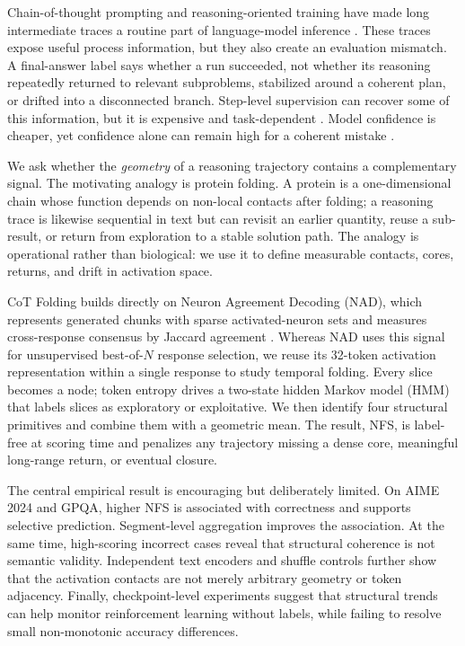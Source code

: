 \documentclass{article}
\newcommand{\nfs}{\textsc{NFS}}
\begin{document}
Chain-of-thought prompting and reasoning-oriented training have made long intermediate traces a routine part of language-model inference \citep{wei2022chain,wang2023selfconsistency,deepseek2025r1}. These traces expose useful process information, but they also create an evaluation mismatch. A final-answer label says whether a run succeeded, not whether its reasoning repeatedly returned to relevant subproblems, stabilized around a coherent plan, or drifted into a disconnected branch. Step-level supervision can recover some of this information, but it is expensive and task-dependent \citep{lightman2023verify}. Model confidence is cheaper, yet confidence alone can remain high for a coherent mistake \citep{kadavath2022know}.

We ask whether the \emph{geometry} of a reasoning trajectory contains a complementary signal. The motivating analogy is protein folding. A protein is a one-dimensional chain whose function depends on non-local contacts after folding; a reasoning trace is likewise sequential in text but can revisit an earlier quantity, reuse a sub-result, or return from exploration to a stable solution path. The analogy is operational rather than biological: we use it to define measurable contacts, cores, returns, and drift in activation space.

CoT Folding builds directly on Neuron Agreement Decoding (NAD), which represents generated chunks with sparse activated-neuron sets and measures cross-response consensus by Jaccard agreement \citep{chen2025nad}. Whereas NAD uses this signal for unsupervised best-of-$N$ response selection, we reuse its 32-token activation representation within a single response to study temporal folding. Every slice becomes a node; token entropy drives a two-state hidden Markov model (HMM) that labels slices as exploratory or exploitative. We then identify four structural primitives and combine them with a geometric mean. The result, \nfs, is label-free at scoring time and penalizes any trajectory missing a dense core, meaningful long-range return, or eventual closure.

The central empirical result is encouraging but deliberately limited. On AIME 2024 and GPQA, higher \nfs{} is associated with correctness and supports selective prediction. Segment-level aggregation improves the association. At the same time, high-scoring incorrect cases reveal that structural coherence is not semantic validity. Independent text encoders and shuffle controls further show that the activation contacts are not merely arbitrary geometry or token adjacency. Finally, checkpoint-level experiments suggest that structural trends can help monitor reinforcement learning without labels, while failing to resolve small non-monotonic accuracy differences.
\end{document}
